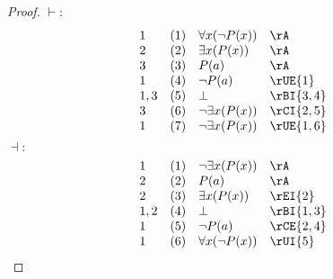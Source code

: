 \documentclass{book}
\theoremstyle{plain}
\theoremstyle{remark}
\theoremstyle{definition}
\begin{document}
\begin{proof}
	\(\vdash:\)
	\[
	\begin{array}{llll}
		1 & (1) & \forall x(\neg P(x)) & \rA \\
		2 & (2) & \exists x(P(x)) & \rA \\
		3 & (3) & P(a) & \rA \\
		1 & (4) & \neg P(a) & \rUE{1} \\
		1,3 & (5) & \bot & \rBI{3,4} \\
		3 & (6) & \neg\exists x(P(x)) & \rCI{2,5} \\
		1 & (7) & \neg\exists x(P(x)) & \rUE{1,6} \\
	\end{array}
	\]
	\(\dashv:\)
	\[
	\begin{array}{llll}
		1 & (1) & \neg\exists x(P(x)) & \rA \\
		2 & (2) & P(a) & \rA \\
		2 & (3) & \exists x(P(x)) & \rEI{2} \\
		1,2 & (4) & \bot & \rBI{1,3} \\
		1 & (5) & \neg P(a) & \rCE{2,4} \\
		1 & (6) & \forall x(\neg P(x)) & \rUI{5} \\
	\end{array}
	\]
\end{proof}
\end{document}
